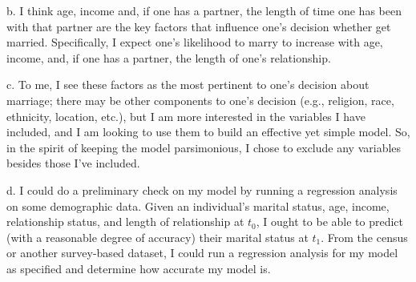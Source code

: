 \documentclass[letterpaper,12pt]{article}
\theoremstyle{definition}
\begin{document}
b.
I think age, income and, if one has a partner, the length of time one has been with that partner are the key factors that influence one's decision whether get married. Specifically, I expect one's likelihood to marry to increase with age, income, and, if one has a partner, the length of one's relationship. 

c.
To me, I see these factors as the most pertinent to one's decision about marriage; there may be other components to one's decision (e.g., religion, race, ethnicity, location, etc.), but I am more interested in the variables I have included, and I am looking to use them to build an effective yet simple model.  So, in the spirit of keeping the model parsimonious, I chose to exclude any variables besides those I've included.

d.
I could do a preliminary check on my model by running a regression analysis on some demographic data. Given an individual's marital status, age, income, relationship status, and length of relationship at $t_0$, I ought to be able to predict (with a reasonable degree of accuracy) their marital status at $t_1$. From the census or another survey-based dataset, I could run a regression analysis for my model as specified and determine how accurate my model is. 
\end{document}
